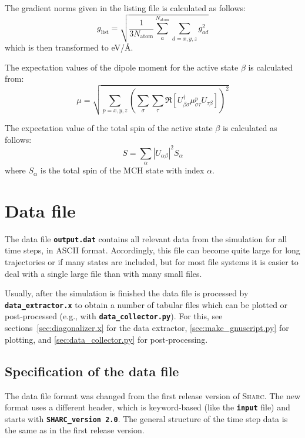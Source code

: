 \documentclass[a4paper,10pt,DIV=15,openany,twoside=false]{scrbook}
\newcommand{\sharc}{\textsc{Sharc}}
\newcommand{\ttt}[1]{\textbf{\texttt{#1}}}
\begin{document}
The gradient norms given in the listing file is calculated as follows:
\begin{equation}
  g_\text{list}=\sqrt{\frac{1}{3N_\text{atom}}\sum\limits_a^{N_\text{atom}}\sum_{d=x,y,z} g_{ad}^2}
\end{equation}
which is then transformed to eV/\AA.

The expectation values of the dipole moment for the active state $\beta$ is calculated from:
\begin{equation}
  \mu=\sqrt{\sum\limits_{p=x,y,z} 
  \left(
    \sum\limits_\sigma\sum\limits_\tau
    \Re\left[
      U_{\beta\sigma}^\dagger \mu_{\sigma\tau}^p U_{\tau\beta}
    \right]
  \right)^2}
\end{equation}

The expectation value of the total spin of the active state $\beta$ is calculated as follows:
\begin{equation}
  S=\sum_\alpha |U_{\alpha\beta}|^2 S_\alpha
\end{equation}
where $S_\alpha$ is the total spin of the MCH state with index $\alpha$.

\section{Data file}\label{sec:datfile}

The data file \ttt{output.dat} contains all relevant data from the simulation for all time steps, in ASCII format. Accordingly, this file can become quite large for long trajectories or if many states are included, but for most file systems it is easier to deal with a single large file than with many small files.

Usually, after the simulation is finished the data file is processed by \ttt{data\_extractor.x} to obtain a number of tabular files which can be plotted or post-processed (e.g., with \ttt{data\_collector.py}). For this, see sections~\ref{sec:diagonalizer.x} for the data extractor, \ref{sec:make_gnuscript.py} for plotting, and \ref{sec:data_collector.py} for post-processing.

\subsection{Specification of the data file}

The data file format was changed from the first release version of \sharc. The new format uses a different header, which is keyword-based (like the \ttt{input} file) and starts with \ttt{SHARC\_version 2.0}. The general structure of the time step data is the same as in the first release version.
\end{document}
